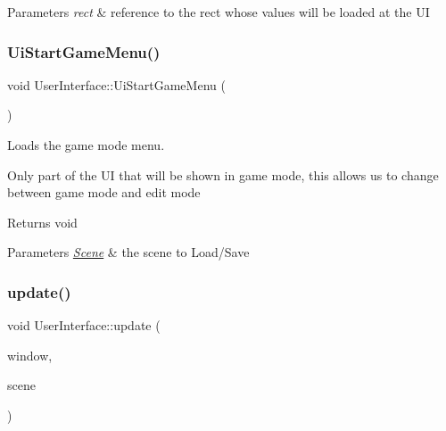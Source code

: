 \begin{DoxyParams}{Parameters}
{\em rect} & reference to the rect whose values will be loaded at the UI \\
\hline
\end{DoxyParams}
\mbox{\label{class_user_interface_aec5f0cf032066ab142d244bfc9735ae6}} 
\subsubsection{\texorpdfstring{Ui\+Start\+Game\+Menu()}{UiStartGameMenu()}}
{\footnotesize\ttfamily void User\+Interface\+::\+Ui\+Start\+Game\+Menu (\begin{DoxyParamCaption}{ }\end{DoxyParamCaption})}



Loads the game mode menu. 

Only part of the UI that will be shown in game mode, this allows us to change between game mode and edit mode

\begin{DoxyReturn}{Returns}
void 
\end{DoxyReturn}

\begin{DoxyParams}{Parameters}
{\em \hyperlink{class_scene}{Scene}} & the scene to Load/\+Save \\
\hline
\end{DoxyParams}
\mbox{\label{class_user_interface_aff195015c5cdd156066745882bd3fa2b}} 
\subsubsection{\texorpdfstring{update()}{update()}}
{\footnotesize\ttfamily void User\+Interface\+::update (\begin{DoxyParamCaption}\item[{sf\+::\+Render\+Window \&}]{window,  }\item[{\hyperlink{class_scene}{Scene} \&}]{scene }\end{DoxyParamCaption})}




